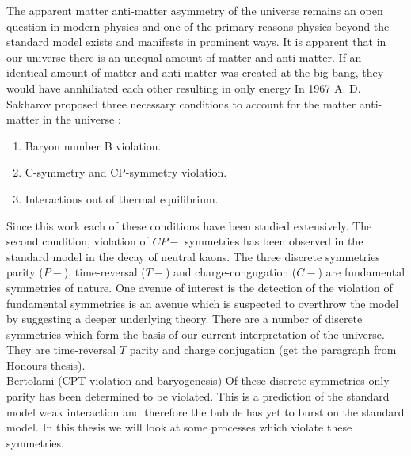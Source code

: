 \documentclass[10pt,a4paper, twoside]{report}
\begin{document}
\linebreak
The apparent matter anti-matter asymmetry of the universe remains an open question in modern physics and one of the primary reasons physics beyond the standard model exists and manifests in prominent ways.  It is apparent that in our universe there is an unequal amount of matter and anti-matter. If an identical amount of matter and anti-matter was created at the big bang, they would have annhiliated each other resulting in only energy
In 1967 A. D. Sakharov proposed three necessary conditions to account for the matter anti-matter in the universe \cite{Sakharov1967}:
\begin{enumerate}
\item Baryon number B violation.
\item  C-symmetry and CP-symmetry violation.
\item Interactions out of thermal equilibrium.
\end{enumerate}
Since this work each of these conditions have been studied extensively. The second condition, violation of $CP-$ symmetries has been observed in the standard model in the decay of neutral kaons. 
The three discrete symmetries parity ($P-$), time-reversal ($T-$) and charge-congugation ($C-$) are fundamental symmetries of nature. 
One avenue of interest is the detection of the violation of fundamental symmetries is an avenue which is suspected to overthrow the model by suggesting a deeper underlying theory.  There are a number of discrete symmetries which form the basis of our current interpretation of the universe. They are time-reversal $T$ parity and charge conjugation (get the paragraph from Honours thesis). \\
Bertolami (CPT violation and baryogenesis)
Of these discrete symmetries only parity has been determined to be violated. This is a prediction of the standard model weak interaction and therefore the bubble has yet to burst on the standard model. In this thesis we will look at some processes which violate these symmetries. \\
\linebreak
\end{document}
